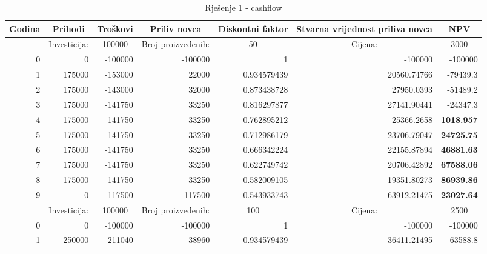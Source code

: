\documentclass[12pt]{article}
\begin{document}
\begin{landscape}
\begin{table}[htbp]
  \centering
  \caption{Rješenje 1 - cashflow}
    \begin{tabular}{rrrrrrr}
    \toprule
    \multicolumn{1}{c}{Godina} & \multicolumn{1}{c}{Prihodi} & \multicolumn{1}{c}{Troškovi} & \multicolumn{1}{c}{Priliv novca} & \multicolumn{1}{c}{Diskontni faktor} & \multicolumn{1}{p{9.355em}}{Stvarna vrijednost \newline{}priliva novca} & \multicolumn{1}{c}{NPV} \\
    \midrule
          & \multicolumn{1}{c}{Investicija:} & \multicolumn{1}{c}{100000} & \multicolumn{1}{c}{Broj proizvedenih:} & \multicolumn{1}{c}{50} & \multicolumn{1}{c}{Cijena:} & \multicolumn{1}{c}{3000} \\
    \midrule
0     & 0     & -100000 & -100000 & 1     & -100000 & -100000 \\
    1     & 175000 & -153000 & 22000 & 0.934579439 & 20560.74766 & -79439.3 \\
    2     & 175000 & -143000 & 32000 & 0.873438728 & 27950.0393 & -51489.2 \\
    3     & 175000 & -141750 & 33250 & 0.816297877 & 27141.90441 & -24347.3 \\
    4     & 175000 & -141750 & 33250 & 0.762895212 & 25366.2658 & {\textbf{1018.957}} \\
    5     & 175000 & -141750 & 33250 & 0.712986179 & 23706.79047 & {\textbf{24725.75}} \\
    6     & 175000 & -141750 & 33250 & 0.666342224 & 22155.87894 & {\textbf{46881.63}} \\
    7     & 175000 & -141750 & 33250 & 0.622749742 & 20706.42892 & {\textbf{67588.06}} \\
    8     & 175000 & -141750 & 33250 & 0.582009105 & 19351.80273 & {\textbf{86939.86}} \\
    \midrule
    9     & 0     & -117500 & -117500 & 0.543933743 & -63912.21475 & \textbf{23027.64} \\
    \midrule
          & \multicolumn{1}{c}{Investicija:} & \multicolumn{1}{c}{100000} & \multicolumn{1}{c}{Broj proizvedenih:} & \multicolumn{1}{c}{100} & \multicolumn{1}{c}{Cijena:} & \multicolumn{1}{c}{2500} \\
    \midrule
    0     & 0     & -100000 & -100000 & 1     & -100000 & -100000 \\
    1     & 250000 & -211040 & 38960 & 0.934579439 & 36411.21495 & -63588.8 \\

\end{tabular}
\end{table}
\end{landscape}
\end{document}
